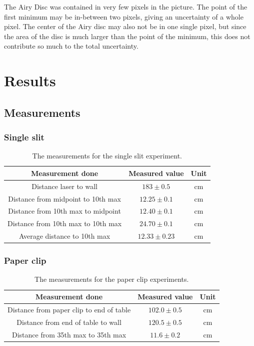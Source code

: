 \documentclass{emulateapj}
\begin{document}
The Airy Disc was contained in very few pixels in the picture. The point of the first minimum may be in-between two pixels, giving an uncertainty of a whole pixel. The center of the Airy disc may also not be in one single pixel, but since the area of the disc is much larger than the point of the minimum, this does not contribute so much to the total uncertainty.

\section{Results}
\label{sec:results}

\subsection{Measurements}
\subsubsection{Single slit}

\begin{table}[H]
\begin{tabular}{ c c c }
Measurement done & Measured value & Unit\\
\hline
Distance laser to wall & $183 \pm 0.5$ & cm \\
Distance from midpoint to 10th max & $12.25 \pm 0.1$ & cm\\
Distance from 10th max to midpoint & $12.40 \pm 0.1$ & cm\\
Distance from 10th max to 10th max & $24.70 \pm 0.1$ & cm\\
Average distance to 10th max & $12.33 \pm 0.23$ & cm\\
\end{tabular}
\caption{The measurements for the single slit experiment.}
\end{table}\label{tab:dataSingleSlit}

\subsubsection{Paper clip}

\begin{table}[H]
\begin{tabular}{ c c c }
Measurement done & Measured value & Unit\\
\hline
Distance from paper clip to end of table & $102.0 \pm 0.5$ & cm \\
Distance from end of table to wall & $120.5 \pm 0.5$ & cm \\
Distance from 35th max to 35th max & $11.6 \pm 0.2$ & cm\\
\end{tabular}
\caption{The measurements for the paper clip experiments.}
\end{table}\label{tab:dataPaperClip}
\end{document}
